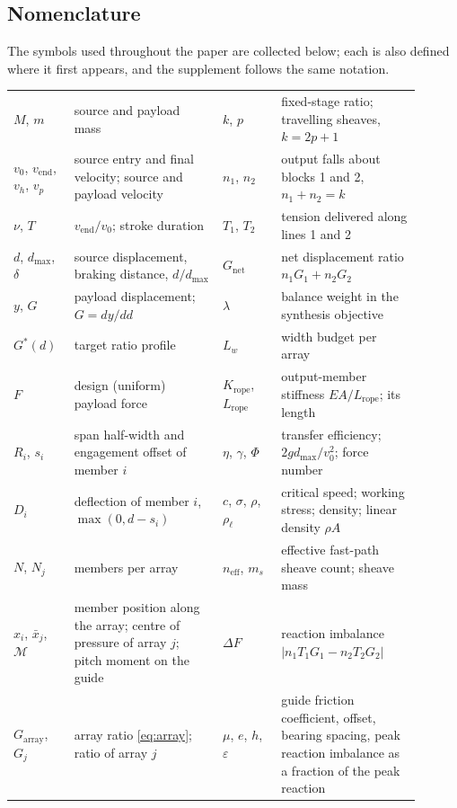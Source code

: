 \documentclass[preprint,12pt,number]{elsarticle}
\newcommand{\Gnet}{G_{\mathrm{net}}}
\newcommand{\Garr}{G_{\mathrm{array}}}
\newcommand{\Gstar}{G^{*}}
\newcommand{\Krope}{K_{\mathrm{rope}}}
\newcommand{\Lrope}{L_{\mathrm{rope}}}
\newcommand{\Lw}{L_{w}}
\newcommand{\dmax}{d_{\max}}
\newcommand{\neff}{n_{\mathrm{eff}}}
\begin{document}
\subsection{Nomenclature}
\label{sec:nomen}

The symbols used throughout the paper are collected below; each is also defined where it first appears, and the supplement follows the same notation.

\smallskip
\begin{footnotesize}
\noindent
\begin{tabular}{@{}p{0.115\linewidth}>{\raggedright\arraybackslash}p{0.335\linewidth}p{0.135\linewidth}>{\raggedright\arraybackslash}p{0.315\linewidth}@{}}
$M$, $m$ & source and payload mass & $k$, $p$ & fixed-stage ratio; travelling sheaves, $k = 2p+1$ \\
$v_0$, $v_{\mathrm{end}}$, $v_h$, $v_p$ & source entry and final velocity; source and payload velocity & $n_1$, $n_2$ & output falls about blocks 1 and 2, $n_1 + n_2 = k$ \\
$\nu$, $T$ & $v_{\mathrm{end}}/v_0$; stroke duration & $T_1$, $T_2$ & tension delivered along lines 1 and 2 \\
$d$, $\dmax$, $\delta$ & source displacement, braking distance, $d/\dmax$ & $\Gnet$ & net displacement ratio $n_1 G_1 + n_2 G_2$ \\
$y$, $G$ & payload displacement; $G = dy/dd$ & $\lambda$ & balance weight in the synthesis objective \\
$\Gstar(d)$ & target ratio profile & $\Lw$ & width budget per array \\
$F$ & design (uniform) payload force & $\Krope$, $\Lrope$ & output-member stiffness $EA/\Lrope$; its length \\
$R_i$, $s_i$ & span half-width and engagement offset of member $i$ & $\eta$, $\gamma$, $\Phi$ & transfer efficiency; $2g\dmax/v_0^2$; force number \\
$D_i$ & deflection of member $i$, $\max(0, d - s_i)$ & $c$, $\sigma$, $\rho$, $\rho_\ell$ & critical speed; working stress; density; linear density $\rho A$ \\
$N$, $N_j$ & members per array & $\neff$, $m_s$ & effective fast-path sheave count; sheave mass \\
$x_i$, $\bar{x}_j$, $\mathcal{M}$ & member position along the array; centre of pressure of array $j$; pitch moment on the guide & $\Delta F$ & reaction imbalance $|n_1 T_1 G_1 - n_2 T_2 G_2|$ \\
$\Garr$, $G_j$ & array ratio \eqref{eq:array}; ratio of array $j$ & $\mu$, $e$, $h$, $\varepsilon$ & guide friction coefficient, offset, bearing spacing, peak reaction imbalance as a fraction of the peak reaction \\
\end{tabular}
\end{footnotesize}
\vspace{6pt}
\end{document}
